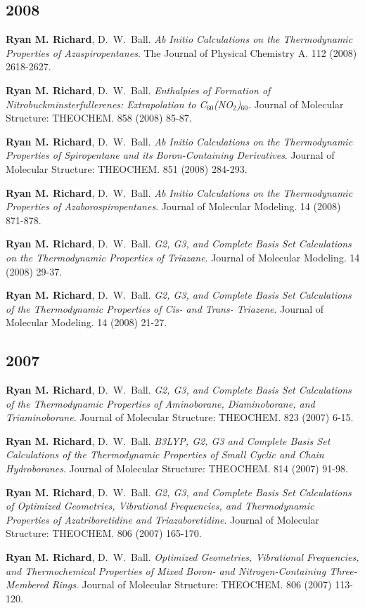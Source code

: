 \begin{etaremune}
	\subsection{2008}
	\item{\textbf{Ryan M. Richard}, D.~W.~Ball.  {\em  Ab Initio Calculations on
	      the Thermodynamic Properties of Azaspiropentanes}.  The Journal of 
		  Physical Chemistry A.  112 (2008) 2618-2627.}
	\item{\textbf{Ryan M. Richard}, D.~W.~Ball. {\em Enthalpies of Formation of 
	      Nitrobuckminsterfullerenes: Extrapolation to C$_{60}$(NO$_2$)$_{60}$}.  
		  Journal of Molecular Structure: THEOCHEM.  858 (2008) 85-87.}
	\item{\textbf{Ryan M. Richard}, D.~W.~Ball. {\em Ab Initio Calculations on 
	      the Thermodynamic Properties of Spiropentane and its Boron-Containing 
		  Derivatives}.  Journal of Molecular Structure: THEOCHEM.  851 (2008) 
		  284-293.}
	\item{\textbf{Ryan M. Richard}, D.~W.~Ball. {\em Ab Initio Calculations on 
	      the Thermodynamic Properties of Azaborospiropentanes}.  Journal of 
		  Molecular Modeling. 14 (2008) 871-878. }
	\item{\textbf{Ryan M. Richard}, D.~W.~Ball. {\em G2, G3, and Complete Basis 
	      Set Calculations on the Thermodynamic Properties of Triazane}.  
		  Journal of Molecular Modeling.  14 (2008) 29-37.}
	\item{\textbf{Ryan M. Richard}, D.~W.~Ball. {\em G2, G3, and Complete Basis 
	      Set Calculations of the Thermodynamic Properties of Cis- and Trans-
		  Triazene}.  Journal of Molecular Modeling.  14 (2008) 21-27.}
	
	\subsection{2007}
	\item{\textbf{Ryan M. Richard}, D.~W.~Ball. {\em G2, G3, and Complete Basis 
	      Set Calculations of the Thermodynamic Properties of Aminoborane, 
		  Diaminoborane, and Triaminoborane}.  Journal of Molecular Structure: 
		  THEOCHEM.  823 (2007) 6-15.}
	\item{\textbf{Ryan M. Richard}, D.~W.~Ball. {\em B3LYP, G2, G3 and Complete 
	      Basis Set Calculations of the Thermodynamic Properties of Small Cyclic
		  and Chain Hydroboranes}.  Journal of Molecular Structure: THEOCHEM. 
		  814 (2007) 91-98.}
	\item{\textbf{Ryan M. Richard}, D.~W.~Ball. {\em G2, G3, and Complete Basis 
	      Set Calculations of Optimized Geometries, Vibrational Frequencies, and
		  Thermodynamic Properties of Azatriboretidine and Triazaboretidine}.  
		  Journal of Molecular Structure: THEOCHEM.  806 (2007) 165-170.}
	\item{\textbf{Ryan M. Richard}, D.~W.~Ball.  {\em Optimized Geometries, 
	      Vibrational Frequencies, and Thermochemical Properties of Mixed Boron- 
		  and Nitrogen-Containing Three-Membered Rings}. Journal of Molecular 
		  Structure: THEOCHEM.  806 (2007) 113-120.}


\end{etaremune}
